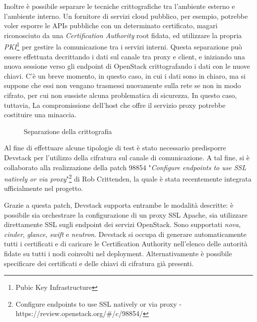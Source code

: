 \documentclass[../main.tex]{subfiles}
\begin{document}
Inoltre è possibile separare le tecniche crittografiche tra l'ambiente esterno e l'ambiente interno.
Un fornitore di servizi cloud pubblico, per esempio, potrebbe voler esporre le APIs pubbliche con un determinato certificato, magari riconosciuto da una \textit{Certification Authority} root fidata, ed utilizzare la propria \textit{PKI}\footnote{Pubic Key Infrastructure} per gestire la comunicazione tra i servizi interni.
Questa separazione può essere effettuata decrittando i dati sul canale tra proxy e client,
e iniziando una nuova sessione verso gli endpoint di OpenStack crittografando i dati con le nuove chiavi.
C'è un breve momento, in questo caso, in cui i dati sono in chiaro, ma si suppone che essi non vengano trasmessi nuovamente sulla rete se non in modo cifrato, per cui non sussiste alcuna problematica di sicurezza.
In questo caso, tuttavia,  La compromissione dell'host che offre il servizio proxy potrebbe costituire una minaccia.
\begin{figure}[H]
\centering
{}
\caption{Separazione della crittografia \cite{OpenStackSecurity}}\label{SSLSep}
\end{figure}

Al fine di effettuare alcune tipologie di test è stato necessario predisporre Devstack per l'utilizzo della cifratura sul canale di comunicazione.
A tal fine, si è collaborato alla realizzazione della patch 98854 "\textit{Configure endpoints to use SSL natively or via proxy}"\footnote{Configure endpoints to use SSL natively or via proxy
 - https://review.openstack.org/\#/c/98854/} di Rob Crittenden, la quale è stata recentemente integrata ufficialmente nel progetto.

Grazie a questa patch, Devstack supporta entrambe le modalità descritte: è possibile sia orchestrare la configurazione di un proxy SSL Apache, sia utilizzare direttamente SSL sugli endpoint dei servizi OpenStack. Sono supportati \textit{nova}, \textit{cinder}, \textit{glance}, \textit{swift} e \textit{neutron}.
Devstack si occupa di generare automaticamente tutti i certificati e di caricare le Certification Authority nell'elenco delle autorità fidate su tutti i nodi coinvolti nel deployment.
Alternativamente è possibile specificare dei certificati e delle chiavi di cifratura già presenti.
\end{document}
